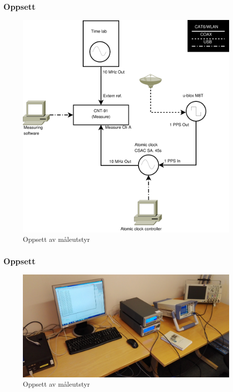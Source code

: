 \documentclass[xcolor=table]{beamer}
\begin{document}
\begin{frame}
\frametitle{Oppsett}
      \begin{figure}
        \includegraphics[scale=0.25]{thesis/graphics/measure_setup.pdf}
        \caption{Oppsett av måleutstyr}
      \end{figure}
\end{frame}

\begin{frame}
\frametitle{Oppsett}
      \begin{figure}
        \includegraphics[scale=0.08]{thesis/graphics/lab_setup_cropped.jpg}
        \caption{Oppsett av måleutstyr}
      \end{figure}
\end{frame}
\end{document}

